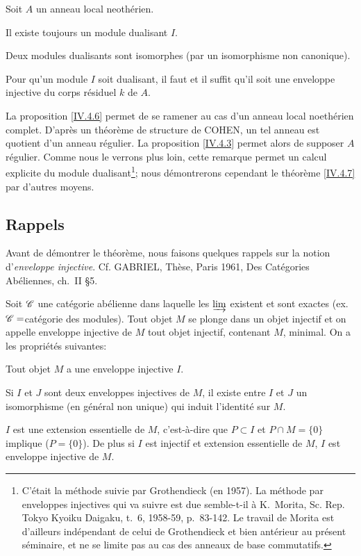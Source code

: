 \begin{theoreme} \label{IV.4.7}
Soit $A$ un anneau local neoth\'erien.
\begin{enumeratea}
\item
Il existe toujours un module dualisant $I$.

\item
Deux modules dualisants sont isomorphes (par un isomorphisme non canonique).

\item
Pour qu'un module $I$ soit dualisant, il faut et il suffit qu'il soit une enveloppe injective du corps r\'esiduel $k$ de $A$.
\end{enumeratea}
\end{theoreme}

\begin{remarque} \label{IV.4.8}
La proposition \ref{IV.4.6} permet de se ramener au cas d'un anneau local noeth\'erien complet. D'apr\`es un th\'eor\`eme de structure de COHEN, un tel anneau est quotient d'un anneau r\'egulier. La proposition \ref{IV.4.3} permet alors de supposer $A$ r\'egulier. Comme nous le verrons plus loin, cette remarque permet un calcul explicite du module dualisant\footnote{C'\'etait la m\'ethode suivie par Grothendieck (en 1957). La m\'ethode par enveloppes injectives qui va suivre est due semble-t-il \`a K.\, Morita, Sc. Rep. Tokyo Kyoiku Daigaku, t.\, 6, 1958-59, p.\, 83-142. Le travail de Morita est d'ailleurs ind\'ependant de celui de Grothendieck et bien ant\'erieur au pr\'esent s\'eminaire, et ne se limite pas au cas des anneaux de base commutatifs.}; nous d\'emontrerons cependant le th\'eor\`eme \ref{IV.4.7} par d'autres moyens.
\end{remarque}

\subsection*{Rappels}
Avant de d\'emontrer le th\'eor\`eme, nous faisons quelques rappels sur la notion d'\emph{enveloppe injective}. Cf. GABRIEL, Th\`ese, Paris 1961, Des Cat\'egories Ab\'eliennes, ch.\, II \S 5.

Soit ${\mathscr C}$ une cat\'egorie ab\'elienne dans laquelle les $\varinjlim$ existent et sont exactes (ex. ${\mathscr C}=$cat\'egorie des modules). Tout objet $M$ se plonge dans un objet injectif et on appelle enveloppe injective de $M$ tout objet injectif, contenant $M$, minimal. On a les propri\'et\'es suivantes:
\begin{enumeratei}
\item
Tout objet $M$ a une enveloppe injective $I$.
\item
Si $I$ et $J$ sont deux enveloppes injectives de $M$, il existe entre $I$ et $J$ un isomorphisme (en g\'en\'eral non unique) qui induit l'identit\'e sur $M$.
\item
$I$ est une extension essentielle\label{pIV.13} de $M$, c'est-\`a-dire que $P\subset I$ et $P\cap M=\{ 0\}$ implique ($P=\{ 0\}$). De plus si $I$ est injectif et extension essentielle de $M$, $I$ est enveloppe injective de $M$.
\end{enumeratei}

